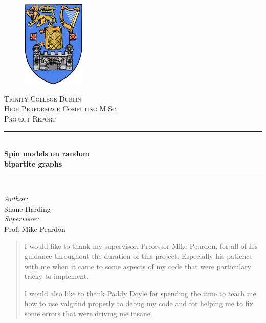\documentclass[pdftex,12pt,a4paper]{article}
\newcommand{\HRule}{\rule{\linewidth}{0.5mm}}
\begin{document}

\begin{titlepage}
\begin{center}

\begin{figure}

\centering
\includegraphics[width=30mm]{Crest.png}

\end{figure}


\textsc{\LARGE Trinity College Dublin}\\
\textsc{\Large High Performace Computing M.Sc. \\ Project Report}

\HRule \\[0.4cm]
{\huge \bfseries Spin models on random \\ bipartite graphs \\[0.4cm] }

\HRule \\[1.5cm]

\Large \emph{Author:} \\ Shane Harding \\[0.8cm]

\large \emph{Supervisor:} \\ Prof. Mike Peardon

\end{center}

\end{titlepage}





\vspace*{\fill}
\renewcommand{\abstractname}{Acknowledgements}
\begin{abstract}

I would like to thank my supervisor, Professor Mike Peardon, for all of his guidance throughout the duration of this project. Especially his patience with me when it came to some aspects of my code that were particulary tricky to implement. 

I would also like to thank Paddy Doyle for spending the time to teach me how to use valgrind properly to debug my code and for helping me to fix some errors that were driving me insane.

\end{abstract}
\vspace*{\fill}
\newpage
\end{document}

